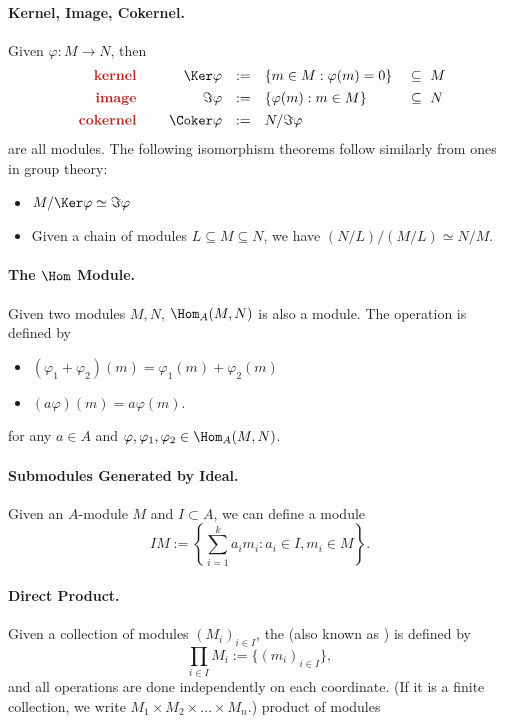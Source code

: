 \paragraph{Kernel, Image, Cokernel.}
Given $\varphi : M\to N$, then 
$$\begin{array}{rrcll}
    \text{\vocab{kernel}}\quad &
    \Ker\varphi &:=& \{m\in M : \varphi(m)=0\}
    &\ \subseteq\ M\\[4pt]
    \text{\vocab{image}}\quad &
    \Im\varphi &:=& \{\varphi(m) : m\in M\} 
    &\ \subseteq\ N\\[4pt]
    \text{\vocab{cokernel}}\quad &
    \Coker\varphi &:=& N/\Im\varphi
\end{array}$$
are all modules.
The following isomorphism theorems follow similarly
from ones in group theory:
\begin{itemize}
    \item $M/\Ker\varphi\simeq\Im\varphi$
    \item Given a chain of modules $L\subseteq M\subseteq N$,
    we have $(N/L)/(M/L) \simeq N/M$.
\end{itemize}
\paragraph{The $\Hom$ Module.}
Given two modules $M,N$, $\Hom_A(M,N)$ is also a module.
The operation is defined by
\begin{itemize}
    \item $(\varphi_1 + \varphi_2)(m) = \varphi_1(m) + \varphi_2(m)$ 
    \item $(a\varphi)(m) =a\varphi(m)$.
\end{itemize}
for any $a\in A$ and $\varphi,\varphi_1,\varphi_2\in \Hom_A(M,N)$.
\paragraph{Submodules Generated by Ideal.}
Given an $A$-module $M$ and $I\subset A$,
we can define a module
$$IM := \left\{\sum_{i=1}^k a_im_i : a_i\in I, m_i\in M\right\}.$$

\paragraph{Direct Product.}
Given a collection of modules $(M_i)_{i\in I}$, 
the  (also known as )
is defined by
$$\prod_{i\in I} M_i := \{(m_i)_{i\in I}\},$$
and all operations are done independently on each coordinate.
(If it is a finite collection, we write
$M_1\times M_2 \times \dots\times M_n$.)
{product of modules}

